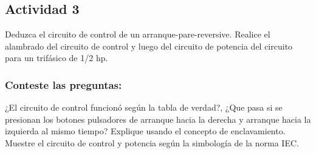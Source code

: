 \subsection{Actividad 3}

Deduzca el circuito de control de un arranque-pare-reversive. Realice el alambrado del circuito de control y luego del circuito de potencia del circuito para un trifásico de 1/2 hp.

\subsubsection{Conteste las preguntas:} 

 ¿El circuito de control funcionó según la tabla de verdad?, ¿Que pasa si se presionan los botones pulsadores de arranque hacia la derecha y arranque hacia la izquierda al mismo tiempo? Explique usando el concepto de enclavamiento. 
 Muestre el circuito de control y potencia según la simbología de la norma IEC.



